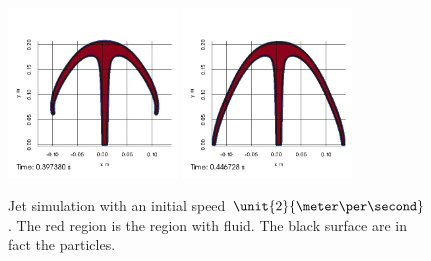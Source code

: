 \begin{figure}
\begin{center}
{}
\subcaptionbox{\label{top:jet:G:5}}
{
\includegraphics[width=0.4\textwidth]{topology/JetGrand/topo0005.jpg}
}
\subcaptionbox{\label{top:jet:G:6}}
{
\includegraphics[width=0.4\textwidth]{topology/JetGrand/topo0006.jpg}
}
\end{center}
\caption{Jet simulation with an initial speed $\unit{2}{\meter \per \second}$.
The red region is the region with fluid. The black surface are in fact the particles.}
\label{top:jet:G}
\end{figure}

